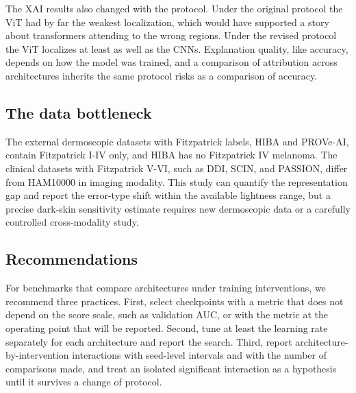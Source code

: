 The XAI results also changed with the protocol. Under the original protocol the ViT had by far the weakest localization, which would have supported a story about transformers attending to the wrong regions. Under the revised protocol the ViT localizes at least as well as the CNNs. Explanation quality, like accuracy, depends on how the model was trained, and a comparison of attribution across architectures inherits the same protocol risks as a comparison of accuracy.

\subsection{The data bottleneck}

The external dermoscopic datasets with Fitzpatrick labels, HIBA and PROVe-AI, contain Fitzpatrick I-IV only, and HIBA has no Fitzpatrick IV melanoma. The clinical datasets with Fitzpatrick V-VI, such as DDI, SCIN, and PASSION, differ from HAM10000 in imaging modality. This study can quantify the representation gap and report the error-type shift within the available lightness range, but a precise dark-skin sensitivity estimate requires new dermoscopic data or a carefully controlled cross-modality study.

\subsection{Recommendations}

For benchmarks that compare architectures under training interventions, we recommend three practices. First, select checkpoints with a metric that does not depend on the score scale, such as validation AUC, or with the metric at the operating point that will be reported. Second, tune at least the learning rate separately for each architecture and report the search. Third, report architecture-by-intervention interactions with seed-level intervals and with the number of comparisons made, and treat an isolated significant interaction as a hypothesis until it survives a change of protocol.
